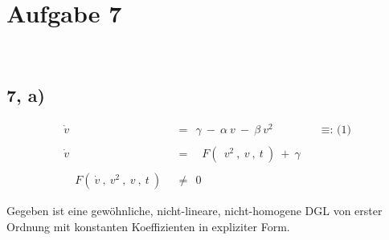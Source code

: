 \section*{Aufgabe 7}

~\\


\subsection*{7, a)}


\setcounter{tc}{0}

\begin{align*}
	\dot{v} ~~ &= ~~ \gamma ~ - ~ \alpha ~ v ~ - ~ \beta ~ v^2 \qquad \qquad \text{$\equiv$: (1)} \\ \\
   \dot{v} ~~ &= \quad F \left( ~ ~ v^2 ~ , ~ v ~ , ~ t ~ \right) ~ + ~ \gamma \\ \\
    \quad F \left( ~ \dot{v} ~ , ~ v^2 ~ , ~ v ~ , ~ t ~ \right) ~~ &\neq ~~ 0
\end{align*}

\hfill

Gegeben ist eine gewöhnliche, nicht-lineare, nicht-homogene DGL von erster Ordnung mit konstanten Koeffizienten in expliziter Form.

~\\

